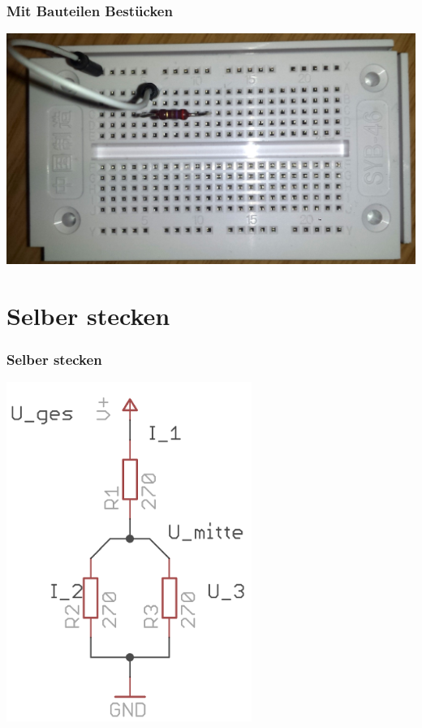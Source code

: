 \begin{frame}
    \frametitle{Mit Bauteilen Bestücken}
	\begin{center}
        \includegraphics[width=1\textwidth]{e99/Wiederstand_eingebaut.jpg}
    \end{center}

\end{frame}

\section*{Selber stecken}

\begin{frame}
    \frametitle{Selber stecken}
	\begin{center}
        \includegraphics[width=0.6\textwidth]{e99/Steckbrett_ersteUebung.png}
    \end{center}
\end{frame}


